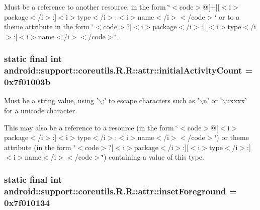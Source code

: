 Must be a reference to another resource, in the form \char`\"{}$<$code$>$@\mbox{[}+\mbox{]}\mbox{[}$<$i$>$package$<$/i$>$:\mbox{]}$<$i$>$type$<$/i$>$:$<$i$>$name$<$/i$>$$<$/code$>$\char`\"{} or to a theme attribute in the form \char`\"{}$<$code$>$?\mbox{[}$<$i$>$package$<$/i$>$:\mbox{]}\mbox{[}$<$i$>$type$<$/i$>$:\mbox{]}$<$i$>$name$<$/i$>$$<$/code$>$\char`\"{}. \hypertarget{classandroid_1_1support_1_1coreutils_1_1_r_1_1attr_3ec5484954ea38f40db49d1e2063b17f}{
\subsubsection[{initialActivityCount}]{\setlength{\rightskip}{0pt plus 5cm}static final int android::support::coreutils.R.R::attr::initialActivityCount = 0x7f01003b}}
\label{classandroid_1_1support_1_1coreutils_1_1_r_1_1attr_3ec5484954ea38f40db49d1e2063b17f}


Must be a \hyperlink{classandroid_1_1support_1_1coreutils_1_1_r_1_1string}{string} value, using '$\backslash$;' to escape characters such as '$\backslash$n' or '$\backslash$uxxxx' for a unicode character. 

This may also be a reference to a resource (in the form \char`\"{}$<$code$>$@\mbox{[}$<$i$>$package$<$/i$>$:\mbox{]}$<$i$>$type$<$/i$>$:$<$i$>$name$<$/i$>$$<$/code$>$\char`\"{}) or theme attribute (in the form \char`\"{}$<$code$>$?\mbox{[}$<$i$>$package$<$/i$>$:\mbox{]}\mbox{[}$<$i$>$type$<$/i$>$:\mbox{]}$<$i$>$name$<$/i$>$$<$/code$>$\char`\"{}) containing a value of this type. \hypertarget{classandroid_1_1support_1_1coreutils_1_1_r_1_1attr_8f05f3facd59ae773f76b979155b78bb}{
\subsubsection[{insetForeground}]{\setlength{\rightskip}{0pt plus 5cm}static final int android::support::coreutils.R.R::attr::insetForeground = 0x7f010134}}
\label{classandroid_1_1support_1_1coreutils_1_1_r_1_1attr_8f05f3facd59ae773f76b979155b78bb}


